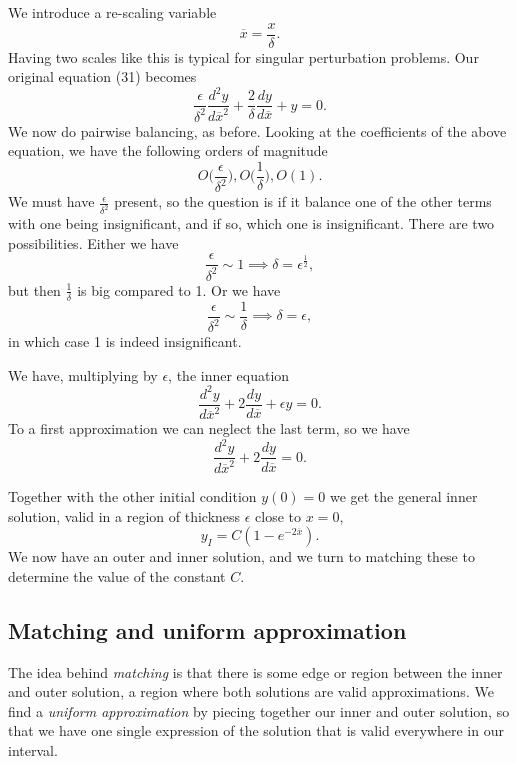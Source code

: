 \documentclass[12pt]{article}
\begin{document}
We introduce a re-scaling variable
\begin{equation}
\overline{x} = \frac{x}{\delta}.
\end{equation}
Having two scales like this is typical for singular perturbation problems. Our
original equation (31) becomes
\begin{equation}
\frac{\epsilon}{\delta^2} \frac{d^2y}{d\overline{x}^2} + \frac{2}{\delta}
\frac{dy}{d\overline{x}} + y = 0.
\end{equation}
We now do pairwise balancing, as before. Looking at the coefficients
of the above equation, we have the following orders of magnitude
\begin{equation}
O\Big(\frac{\epsilon}{\delta^2}\Big), O\Big(\frac{1}{\delta}\Big), O(1).
\end{equation}
We must have $\frac{\epsilon}{\delta^2}$ present, so the question is
if it balance one of the other terms with one being insignificant, and
if so, which one is insignificant. There are two possibilities. Either
we have
\begin{equation}
\frac{\epsilon}{\delta^2} \sim 1 \implies \delta = \epsilon^{\frac{1}{2}},
\end{equation}
but then $\frac{1}{\delta}$ is big compared to 1. Or we have
\begin{equation}
\frac{\epsilon}{\delta^2} \sim \frac{1}{\delta} \implies \delta = \epsilon,
\end{equation}
in which case 1 is indeed insignificant.

We have, multiplying by $\epsilon$, the inner equation
\begin{equation}
\frac{d^2 y}{d \overline{x}^2} + 2 \frac{dy}{d\overline{x}} + \epsilon
y = 0.
\end{equation}
To a first approximation we can neglect the last term, so we have
\begin{equation}
\frac{d^2 y}{d \overline{x}^2} + 2 \frac{dy}{d\overline{x}} = 0.
\end{equation}

Together with the other initial condition $y(0)=0$ we get the general inner
solution, valid in a region of thickness $\epsilon$ close to $x=0$,
\begin{equation}
y_I = C(1 - e^{-2\overline{x}}).
\end{equation}
We now have an outer and inner solution, and we turn to matching these
to determine the value of the constant $C$.

\newpage
\subsection{Matching and uniform approximation}
The idea behind \textit{matching} is that there is some edge or region
between the inner and outer solution, a region where both solutions
are valid approximations. We find a \textit{uniform approximation} by
piecing together our inner and outer solution, so that we have one
single expression of the solution that is valid everywhere in our
interval.
\end{document}
